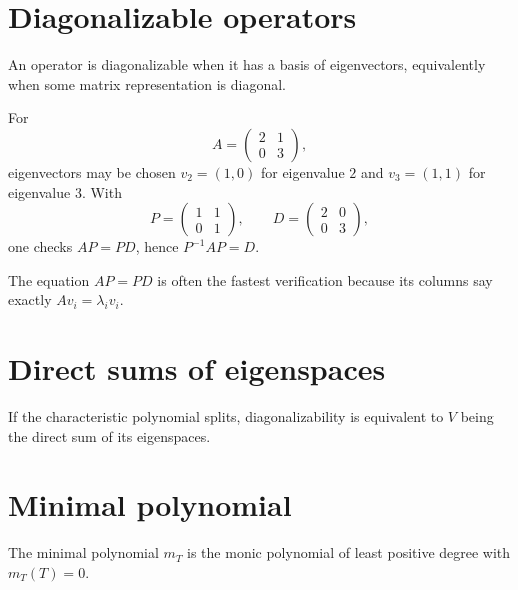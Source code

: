 \section{Diagonalizable operators}
An operator is diagonalizable when it has a basis of eigenvectors, equivalently when some matrix representation is diagonal.


\begin{example}\label{ex:i11-expand-01}
For
\[
A=\begin{pmatrix}2&1\\0&3\end{pmatrix},
\]
eigenvectors may be chosen \(v_2=(1,0)\) for eigenvalue \(2\) and
\(v_3=(1,1)\) for eigenvalue \(3\). With
\[
P=\begin{pmatrix}1&1\\0&1\end{pmatrix},
\qquad
D=\begin{pmatrix}2&0\\0&3\end{pmatrix},
\]
one checks \(AP=PD\), hence \(P^{-1}AP=D\).

The equation \(AP=PD\) is often the fastest verification because its columns
say exactly \(Av_i=\lambda_i v_i\).
\end{example}
\section{Direct sums of eigenspaces}
If the characteristic polynomial splits, diagonalizability is equivalent to $V$ being the direct sum of its eigenspaces.

\section{Minimal polynomial}
The minimal polynomial $m_T$ is the monic polynomial of least positive degree with $m_T(T)=0$.


